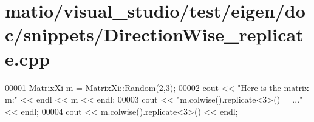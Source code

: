 \hypertarget{matio_2visual__studio_2test_2eigen_2doc_2snippets_2_direction_wise__replicate_8cpp_source}{}\section{matio/visual\+\_\+studio/test/eigen/doc/snippets/\+Direction\+Wise\+\_\+replicate.cpp}
\label{matio_2visual__studio_2test_2eigen_2doc_2snippets_2_direction_wise__replicate_8cpp_source}

\begin{DoxyCode}
00001 MatrixXi m = MatrixXi::Random(2,3);
00002 cout << \textcolor{stringliteral}{"Here is the matrix m:"} << endl << m << endl;
00003 cout << \textcolor{stringliteral}{"m.colwise().replicate<3>() = ..."} << endl;
00004 cout << m.colwise().replicate<3>() << endl;
\end{DoxyCode}

